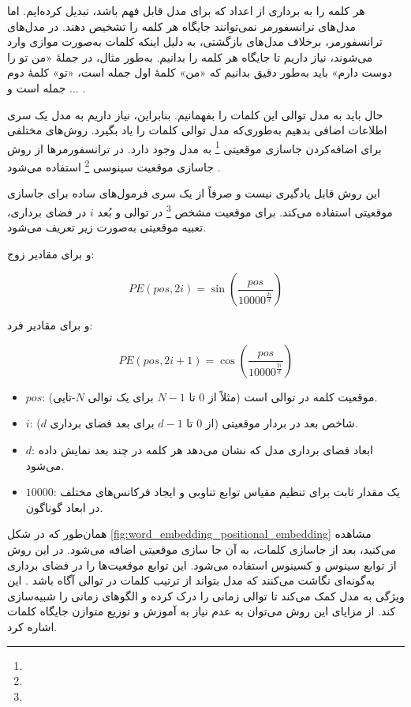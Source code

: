 هر کلمه را به برداری از اعداد که برای مدل قابل فهم باشد، تبدیل کرده‌ایم. اما مدل‌های ترانسفورمر نمی‌توانند جایگاه هر کلمه را تشخیص دهند. در مدل‌های ترانسفورمر، برخلاف مدل‌های بازگشتی، به دلیل اینکه کلمات به‌صورت موازی وارد می‌شوند، نیاز داریم تا جایگاه هر کلمه را بدانیم. به‌طور مثال، در جملهٔ «من تو را دوست دارم» باید به‌طور دقیق بدانیم که «من» کلمهٔ اول جمله است، «تو» کلمهٔ دوم جمله است و ... .

حال باید به مدل توالی این کلمات را بفهمانیم. بنابراین، نیاز داریم به مدل یک سری اطلاعات اضافی بدهیم به‌طوری‌که مدل توالی کلمات را یاد بگیرد. روش‌های مختلفی برای اضافه‌کردن جاسازی موقعیتی \footnote{} به مدل وجود دارد. در ترانسفورمرها از روش جاسازی موقعیت سینوسی
 \footnote{} استفاده می‌شود \cite{vaswani2017attention}.



این روش قابل یادگیری نیست و صرفاً از یک سری فرمول‌های ساده برای جاسازی موقعیتی استفاده می‌کند.  
برای موقعیت مشخص \footnote{} در توالی و بُعد \( i \) در فضای برداری، تعبیه موقعیتی به‌صورت زیر تعریف می‌شود.  

و برای مقادیر زوج:  

\begin{equation}
	PE(pos, 2i) = \sin\left( \frac{pos}{10000^{\frac{2i}{d}}} \right)
	\label{eq:pe_even}
\end{equation}

و برای مقادیر فرد:  

\begin{equation}
	PE(pos, 2i+1) = \cos\left( \frac{pos}{10000^{\frac{2i}{d}}} \right)
	\label{eq:pe_odd}
\end{equation}
	



\begin{itemize}
	\item \( pos \): موقعیت کلمه در توالی است (مثلاً از \( 0 \) تا \( N-1 \) برای یک توالی \( N \)-تایی).
	\item \( i \): شاخص بعد در بردار موقعیتی (از \( 0 \) تا \( d-1 \) برای بعد فضای برداری \( d \)).
	\item \( d \): ابعاد فضای برداری مدل که نشان می‌دهد هر کلمه در چند بعد نمایش داده می‌شود.
	\item \( 10000 \): یک مقدار ثابت برای تنظیم مقیاس توابع تناوبی و ایجاد فرکانس‌های مختلف در ابعاد گوناگون.
\end{itemize}  

همان‌طور که در شکل \autoref{fig:word_embedding_positional_embedding} مشاهده می‌کنید، بعد از جاسازی کلمات، به آن جا سازی موقعیتی اضافه می‌شود. در این روش از توابع سینوس و کسینوس استفاده می‌شود. این توابع موقعیت‌ها را در فضای برداری به‌گونه‌ای نگاشت می‌کنند که مدل بتواند از ترتیب کلمات در توالی آگاه باشد \cite{vaswani2017attention}. این ویژگی به مدل کمک می‌کند تا توالی زمانی را درک کرده و الگوهای زمانی را شبیه‌سازی کند. از مزایای این روش می‌توان به عدم نیاز به آموزش و توزیع متوازن جایگاه کلمات اشاره کرد.

